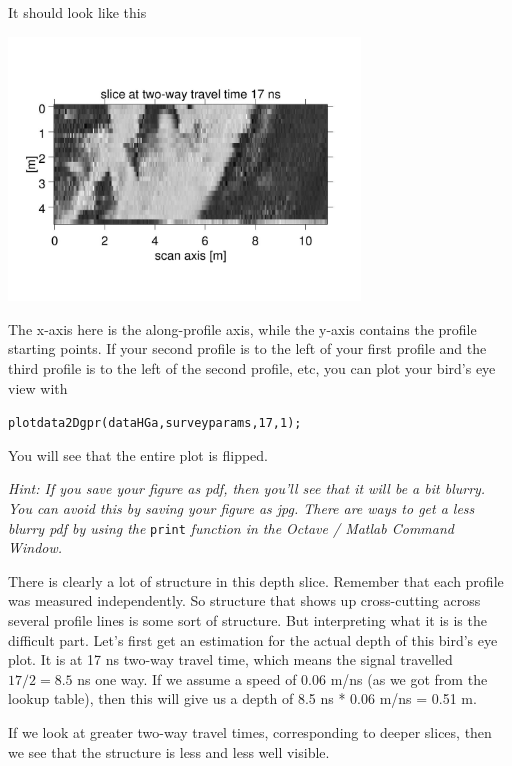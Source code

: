 \documentclass[11pt]{article}
\begin{document}
It should look like this
\begin{center}
\includegraphics[width=0.7\textwidth, trim = 1cm 3cm 1cm
  3cm,clip]{figures/Area17ns.jpg}
\end{center}

The x-axis here is the along-profile axis, while the y-axis contains
the profile starting points. If your second profile is to the left of
your first profile and the third profile is to the left of the second
profile, etc, you can plot your bird's eye view with

\qquad \verb#plotdata2Dgpr(dataHGa,surveyparams,17,1);#

You will see that the entire plot is flipped.

\emph{Hint: If you save your figure as pdf, then you'll see that it will be
a bit blurry. You can avoid this by saving your figure as jpg. There
are ways to get a less blurry pdf by using the} \verb#print# \emph{function
in the Octave / Matlab Command Window.}

There is clearly a lot of structure in this depth slice. Remember that
each profile was measured independently. So structure that shows up
cross-cutting across several profile lines is some sort of
structure. But interpreting what it is is the difficult part. Let's
first get an estimation for the actual depth of this bird's eye
plot. It is at 17 ns two-way travel time, which means the signal
travelled $17/2=8.5$ ns one way. If we assume a speed of 0.06 m/ns (as
we got from the lookup table), then this will give us a depth of 8.5
ns * 0.06 m/ns = 0.51 m.

If we look at greater two-way travel times, corresponding to deeper
slices, then we see that the structure is less and less well
visible.
\end{document}
